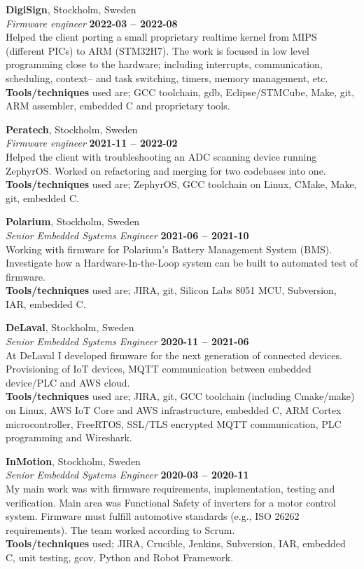 \documentclass[a4paper,margin,line]{res} \usepackage{latexsym}
\begin{document}
\begin{resume}
{\bf DigiSign}, Stockholm, Sweden\\
{\em Firmware engineer} \hfill {\bf 2022-03 -- 2022-08}\\
Helped the client porting a small proprietary realtime kernel from
MIPS (different PICs) to ARM (STM32H7). The work is focused in low
level programming close to the hardware; including interrupts, communication,
scheduling, context-- and task switching, timers, memory management, etc.
\\ {\bf Tools/techniques} used are; GCC toolchain, gdb, Eclipse/STMCube, Make, git,
ARM assembler, embedded C and proprietary tools.

{\bf Peratech}, Stockholm, Sweden\\
{\em Firmware engineer} \hfill {\bf 2021-11 -- 2022-02}\\
Helped the client with troubleshooting an ADC scanning device running
ZephyrOS. Worked on refactoring and merging for two codebases into one.\\
{\bf Tools/techniques} used are; ZephyrOS, GCC toolchain on
Linux, CMake, Make, git, embedded C.


{\bf Polarium}, Stockholm, Sweden\\
{\em Senior Embedded Systems Engineer} \hfill {\bf 2021-06 -- 2021-10}\\
Working with firmware for Polarium's Battery Management System (BMS).
Investigate how a Hardware-In-the-Loop system can be built to automated
test of firmware. \\ {\bf Tools/techniques} used are; JIRA, git, Silicon Labs 8051
MCU, Subversion, IAR, embedded C.


{\bf DeLaval}, Stockholm, Sweden\\
{\em Senior Embedded Systems Engineer} \hfill {\bf 2020-11 --
  2021-06}\\ At DeLaval I developed firmware for the next
generation of connected devices. Provisioning of IoT devices, MQTT
communication between embedded device/PLC and AWS
cloud. \\ {\bf Tools/techniques} used are; JIRA, git, GCC toolchain
(including Cmake/make) on Linux, AWS IoT Core and AWS infrastructure,
embedded C, ARM Cortex microcontroller, FreeRTOS, SSL/TLS encrypted
MQTT communication, PLC programming and Wireshark.


{\bf InMotion}, Stockholm, Sweden\\
{\em Senior Embedded Systems Engineer} \hfill {\bf 2020-03 --
  2020-11}\\ My main work was with firmware requirements,
implementation, testing and verification. Main area was Functional
Safety of inverters for a motor control system. Firmware must fulfill
automotive standards (e.g., ISO 26262 requirements). The team worked
according to Scrum. \\ {\bf Tools/techniques} used; JIRA, Crucible, Jenkins,
Subversion, IAR, embedded C, unit testing, gcov, Python and Robot
Framework.


\end{resume}
\end{document}

